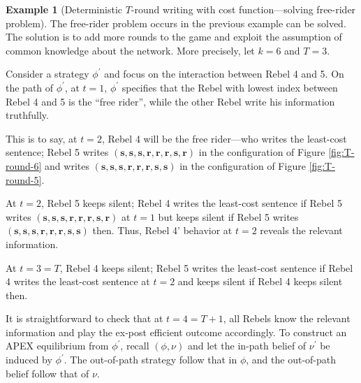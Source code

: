 \documentclass[12pt,letter]{article}
\theoremstyle{definition}
\newtheorem{example}{Example}
\theoremstyle{remark}
\theoremstyle{claim}
\begin{document}
\begin{example}[Deterministic $T$-round writing with cost function---solving free-rider problem]
\label{ex:cost_function_talk_solve_fr}
The free-rider problem occurs in the previous example can be solved. The solution is to add more rounds to the game and exploit the assumption of common knowledge about the network. More precisely, let $k=6$ and $T=3$. 

Consider a strategy $\phi^{'}$ and focus on the interaction between Rebel 4 and 5. On the path of $\phi^{'}$, at $t=1$, $\phi^{'}$ specifies that the Rebel with lowest index between Rebel 4 and 5 is the ``free rider'', while the other Rebel write his information truthfully. 

This is to say, at $t=2$, Rebel 4 will be the free rider---who writes the least-cost sentence; Rebel 5 writes $(\textbf{s},\textbf{s},\textbf{s},\textbf{r},\textbf{r},\textbf{r},\textbf{s},\textbf{r})$ in the configuration of Figure \ref{fig:T-round-6} and writes $(\textbf{s},\textbf{s},\textbf{s},\textbf{r},\textbf{r},\textbf{r},\textbf{s},\textbf{s})$ in the configuration of Figure \ref{fig:T-round-5}. 

At $t=2$, Rebel 5 keeps silent; Rebel 4 writes the least-cost sentence if Rebel 5 writes $(\textbf{s},\textbf{s},\textbf{s},\textbf{r},\textbf{r},\textbf{r},\textbf{s},\textbf{r})$ at $t=1$ but keeps silent if Rebel 5 writes $(\textbf{s},\textbf{s},\textbf{s},\textbf{r},\textbf{r},\textbf{r},\textbf{s},\textbf{s})$ then. Thus, Rebel 4' behavior at $t=2$ reveals the relevant information. 

At $t=3=T$, Rebel 4 keeps silent; Rebel 5 writes the least-cost sentence if Rebel 4 writes the least-cost sentence at $t=2$ and keeps silent if Rebel 4 keeps silent then. 

It is straightforward to check that at $t=4=T+1$, all Rebels know the relevant information and play the ex-post efficient outcome accordingly. To construct an APEX equilibrium from $\phi^{'}$, recall $(\phi,\nu)$ and let the in-path belief of $\nu^{'}$ be induced by $\phi^{'}$. The out-of-path strategy follow that in $\phi$, and the out-of-path belief follow that of $\nu$.   


\end{example}
\end{document}
